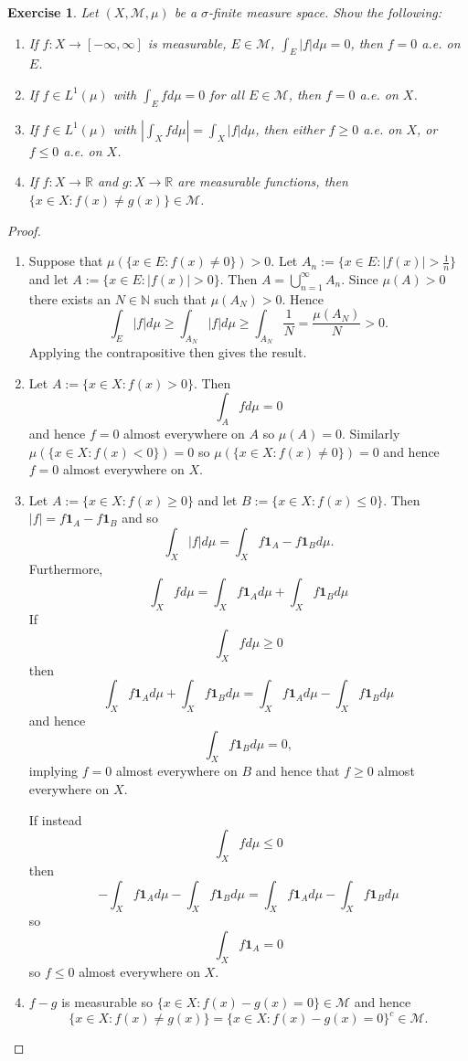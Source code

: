 \documentclass{article}
\newtheorem{exercise}[theorem]{Exercise}
\begin{document}
\begin{exercise}
Let \( (X, \mathcal{M}, \mu) \) be a \(\sigma\)-finite measure space. Show the following:
    
    \begin{enumerate}
        \item[(a)] If \( f : X \to [-\infty, \infty] \) is measurable, \( E \in \mathcal{M} \), \( \int_E |f| d\mu = 0 \), then \( f = 0 \) a.e. on \( E \).
        \item[(b)] If \( f \in L^1(\mu) \) with \( \int_E f d\mu = 0 \) for all \( E \in \mathcal{M} \), then \( f = 0 \) a.e. on \( X \).
        \item[(c)] If \( f \in L^1(\mu) \) with \( |\int_X f d\mu| = \int_X |f| d\mu \), then either \( f \geq 0 \) a.e. on \( X \), or \( f \leq 0 \) a.e. on \( X \).
        \item[(d)] If \( f : X \to \mathbb{R} \) and \( g : X \to \mathbb{R} \) are measurable functions, then \( \{ x \in X : f(x) \neq g(x) \} \in \mathcal{M} \).
    \end{enumerate}
\end{exercise}
\begin{proof}
\begin{enumerate}
    \item[(a)] Suppose that $\mu(\{x\in E:f(x)\neq0\})> 0$. Let $A_n:=\{x\in E:|f(x)|>\frac{1}{n}\}$ and let $A:=\{x\in E:|f(x)|>0\}$. Then $A=\bigcup_{n=1}^\infty A_n$. Since $\mu(A)>0$ there exists an $N\in\mathbb{N}$ such that $\mu(A_N)>0$. Hence \[\int_E|f|d\mu\geq\int_{A_N}|f|d\mu\geq\int_{A_N}\frac{1}{N}=\frac{\mu(A_N)}{N}>0.\] Applying the contrapositive then gives the result.
    \item[(b)] Let $A:=\{x\in X:f(x)>0\}$. Then \[\int_Afd\mu=0\] and hence $f=0$ almost everywhere on $A$ so $\mu(A)=0$. Similarly $\mu(\{x\in X:f(x)<0\})=0$ so $\mu(\{x\in X:f(x)\neq 0\})=0$ and hence $f=0$ almost everywhere on $X$.
    \item[(c)] Let $A:=\{x\in X:f(x)\geq 0\}$ and let $B:=\{x\in X:f(x)\leq 0\}$. Then $|f|=f\mathbf{1}_A-f\mathbf{1}_B$ and so \[\int_X|f|d\mu=\int_Xf\mathbf{1}_A-f\mathbf{1}_Bd\mu.\] Furthermore, \[\int_Xfd\mu=\int_Xf\mathbf{1}_Ad\mu+\int_Xf\mathbf{1}_Bd\mu\] If \[\int_Xfd\mu\geq0\] then \[\int_Xf\mathbf{1}_Ad\mu+\int_Xf\mathbf{1}_Bd\mu=\int_Xf\mathbf{1}_Ad\mu-\int_Xf\mathbf{1}_Bd\mu\] and hence \[\int_Xf\mathbf{1}_Bd\mu=0,\] implying $f=0$ almost everywhere on $B$ and hence that $f\geq 0$ almost everywhere on $X$.

    If instead\[\int_Xfd\mu\leq0\] then \[-\int_Xf\mathbf{1}_Ad\mu-\int_Xf\mathbf{1}_Bd\mu=\int_Xf\mathbf{1}_Ad\mu-\int_Xf\mathbf{1}_Bd\mu\] so \[\int_Xf\mathbf{1}_A=0\] so $f\leq0$ almost everywhere on $X$.
    \item[(d)] $f-g$ is measurable so $\{x\in X:f(x)-g(x)=0\}\in\mathcal{M}$ and hence \[\{x\in X:f(x)\neq g(x)\}=\{x\in X:f(x)-g(x)=0\}^c\in\mathcal{M}.\]
\end{enumerate}
\end{proof}
\end{document}
